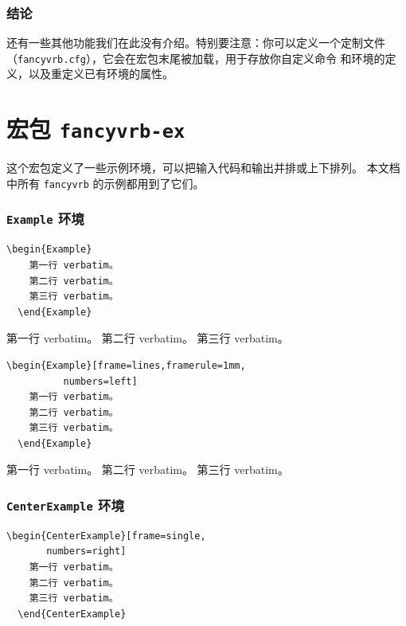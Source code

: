 \documentclass[twoside]{article}
\begin{document}
\begin{changebar}
\fi
\section{结论}

  还有一些其他功能我们在此没有介绍。特别要注意：你可以定义一个定制文件
（\texttt{fancyvrb.cfg}），它会在宏包末尾被加载，用于存放你自定义命令
和环境的定义，以及重定义已有环境的属性。


\clearpage


\part{宏包 \texttt{fancyvrb-ex}}
这个宏包定义了一些示例环境，可以把输入代码和输出并排或上下排列。
本文档中所有 \texttt{fancyvrb} 的示例都用到了它们。

\section{\texttt{Example} 环境}

\begin{Verbatim}[gobble=2]
  \begin{Example}
    第一行 verbatim。
    第二行 verbatim。
    第三行 verbatim。
  \end{Example}
\end{Verbatim}

\begin{Example}
  第一行 verbatim。
  第二行 verbatim。
  第三行 verbatim。
\end{Example}

\begin{Verbatim}[gobble=2]
  \begin{Example}[frame=lines,framerule=1mm,
          numbers=left]
    第一行 verbatim。
    第二行 verbatim。
    第三行 verbatim。
  \end{Example}
\end{Verbatim}

\begin{Example}[frame=lines,framerule=1mm,numbers=left]
  第一行 verbatim。
  第二行 verbatim。
  第三行 verbatim。
\end{Example}

\newpage

\section{\texttt{CenterExample} 环境}

\begin{Verbatim}[gobble=2]
  \begin{CenterExample}[frame=single,
       numbers=right]
    第一行 verbatim。
    第二行 verbatim。
    第三行 verbatim。
  \end{CenterExample}
\end{Verbatim}


\end{changebar}
\end{document}

